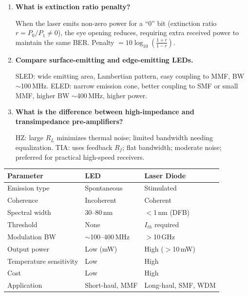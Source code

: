 \documentclass[12pt,a4paper]{article}
\newcommand{\Q}[1]{\textbf{#1}\par\noindent\ignorespaces}
\renewcommand{\arraystretch}{1.45}
\begin{document}
\begin{tcolorbox}[exambox, title={\textbf{Frequently Asked / Viva Questions}}]
\begin{enumerate}[topsep=0pt, label=\textbf{Q\arabic*.}, itemsep=5pt]
  \item \Q{What is extinction ratio penalty?}
    When the laser emits non-zero power for a ``0'' bit (extinction ratio $r = P_0/P_1 \neq 0$), the eye opening reduces, requiring extra received power to maintain the same BER. Penalty $= 10\log_{10}\!\left(\frac{1+r}{1-r}\right)$.
  \item \Q{Compare surface-emitting and edge-emitting LEDs.}
    SLED: wide emitting area, Lambertian pattern, easy coupling to MMF, BW $\sim$100\,MHz. ELED: narrow emission cone, better coupling to SMF or small MMF, higher BW $\sim$400\,MHz, higher power.
  \item \Q{What is the difference between high-impedance and transimpedance pre-amplifiers?}
    HZ: large $R_L$ minimizes thermal noise; limited bandwidth needing equalization. TIA: uses feedback $R_f$; flat bandwidth; moderate noise; preferred for practical high-speed receivers.
\end{enumerate}
\end{tcolorbox}

\begin{tcolorbox}[tikzbox, title={LED vs Laser Diode --- Comparison}]
\centering
{\renewcommand{\arraystretch}{1.45}
\begin{tabularx}{\linewidth}{|B{3.2cm}|Y|Y|}
\hline
\textbf{Parameter} & \textbf{LED} & \textbf{Laser Diode} \\
\hline
Emission type & Spontaneous & Stimulated \\
\hline
Coherence & Incoherent & Coherent \\
\hline
Spectral width & 30--80\,nm & $<$1\,nm (DFB) \\
\hline
Threshold & None & $I_{th}$ required \\
\hline
Modulation BW & $\sim$100--400\,MHz & $>$10\,GHz \\
\hline
Output power & Low (mW) & High ($>$10\,mW) \\
\hline
Temperature sensitivity & Low & High \\
\hline
Cost & Low & High \\
\hline
Application & Short-haul, MMF & Long-haul, SMF, WDM \\
\hline
\end{tabularx}}
\end{tcolorbox}
\end{document}
